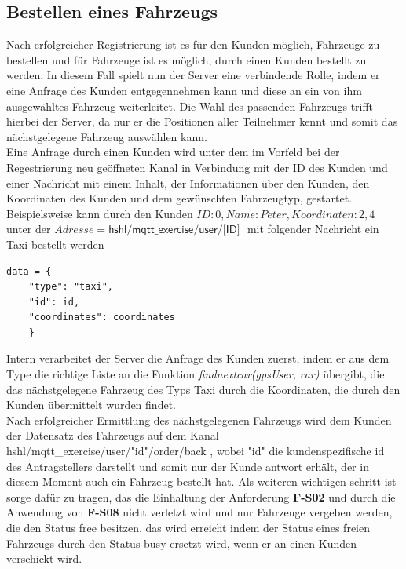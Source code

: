\documentclass[conference]{IEEEtran}
\begin{document}
\subsection{Bestellen eines Fahrzeugs}
Nach erfolgreicher Registrierung ist es für den Kunden möglich, Fahrzeuge zu bestellen und für Fahrzeuge ist es möglich, durch einen Kunden bestellt zu werden. In diesem Fall spielt nun der Server eine verbindende Rolle, indem er eine Anfrage des Kunden entgegennehmen kann und diese an ein von ihm ausgewähltes Fahrzeug weiterleitet. Die Wahl des passenden Fahrzeugs trifft hierbei der Server, da nur er die Positionen aller Teilnehmer kennt und somit das nächstgelegene Fahrzeug auswählen kann.\\ 
Eine Anfrage durch einen Kunden wird unter dem im Vorfeld bei der Regestrierung neu geöffneten Kanal in Verbindung mit der ID des Kunden und einer Nachricht mit einem Inhalt, der Informationen über den Kunden, den Koordinaten des Kunden und dem gewünschten Fahrzeugtyp, gestartet. Beispielsweise kann durch den Kunden $ID: 0, Name: Peter, Koordinaten: 2,4$ unter der $Adresse=\textsf{hshl/mqtt\_exercise/user/[ID] }$ mit folgender Nachricht ein Taxi bestellt werden \begin{lstlisting}
data = {
	"type": "taxi",
    "id": id,
    "coordinates": coordinates
    }
\end{lstlisting}
Intern verarbeitet der Server die Anfrage des Kunden zuerst, indem er aus dem Type die richtige Liste an die Funktion \textit{findnextcar(gpsUser, car)} übergibt, die das nächstgelegene Fahrzeug des Typs Taxi durch die Koordinaten, die durch den Kunden übermittelt wurden findet.\\
Nach erfolgreicher Ermittlung des nächstgelegenen Fahrzeugs wird dem Kunden der Datensatz des Fahrzeugs auf dem Kanal \textsf{hshl/mqtt\_exercise/user/"id"/order/back} , wobei "id"  die kundenspezifische id des Antragstellers darstellt und somit nur der Kunde antwort erhält, der in diesem Moment auch ein Fahrzeug bestellt hat. Als weiteren wichtigen schritt ist sorge dafür zu tragen, das die Einhaltung der Anforderung \textbf{F-S02} und durch die Anwendung von \textbf{F-S08}  nicht verletzt wird und nur Fahrzeuge vergeben werden, die den Status free besitzen, das wird erreicht indem der Status eines freien Fahrzeugs durch den Status busy ersetzt wird, wenn er an einen Kunden verschickt wird.
\end{document}
